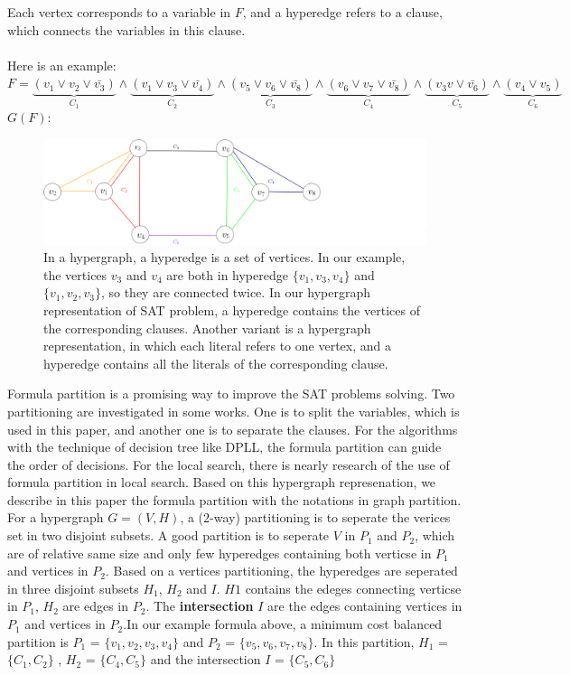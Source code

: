 \documentclass[12pt,a4paper,twoside]{scrartcl}
\numberwithin{equation}{section}
\begin{document}
  Each vertex corresponds to a variable in $F$, and a hyperedge refers to a clause, which connects the variables in this clause. \\
\\
Here is an example:\\
$F =\underbrace{(v_1 \lor v_2 \lor \bar{v_3})}_\text{$C_1$} \land \underbrace{(v_1 \lor v_3\lor \bar{v_4})}_\text{$C_2$}\land \underbrace{(v_5 \lor v_6\lor \bar{v_8})}_\text{$C_3$}\land \underbrace{(v_6 \lor v_7\lor \bar{v_8})}_\text{$C_4$}\land \underbrace{(v_3v\lor \bar{v_6})}_\text{$C_5$}\land \underbrace{(v_4 \lor v_5)}_\text{$C_6$}$\\
$G(F)$:
\begin{figure}[H]
\begin{center}
  \includegraphics[scale = 0.4]{1/hypergraph.png}
  \end{center}
  \caption{In a hypergraph, a hyperedge is a set of vertices. In our example, the vertices  $v_3$  and $v_4$ are both in hyperedge $\{v_1, v_3, v_4\}$ and $\{v_1, v_2, v_3\}$, so they are connected twice. In our hypergraph representation of SAT problem, a hyperedge contains the vertices of the corresponding clauses. Another variant is a hypergraph representation, in which each literal refers to one vertex, and a hyperedge contains all the literals of the corresponding clause.}
  \label{hypergraph representation}
  \end{figure}

Formula partition is a promising way to improve the SAT problems solving. Two partitioning are investigated in some works. One is to split the variables, which is used in this paper, and another one is to separate the clauses. For the algorithms with the technique of decision tree like DPLL, the formula partition can guide the order of decisions. For the local search, there is nearly research of the use of formula partition in local search. Based on this hypergraph represenation, we describe in this paper the formula partition with the notations in graph partition. For a hypergraph $G = (V,H)$,  a ($2$-way) partitioning is to seperate the verices set in two disjoint subsets. A good partition is to seperate $V$ in $P_1$ and $P_2$, which are of relative same size and only few hyperedges containing both verticse in $P_1$ and vertices in $P_2$.  Based on a vertices partitioning, the hyperedges are seperated in three disjoint subsets $H_1$, $H_2$ and $I$. $H1$ contains the edeges connecting verticse in $P_1$, $H_2$ are edges in $P_2$. The \textbf{intersection} $I$ are the edges containing vertices in $P_1$ and vertices in $P_2$.In our example formula above, a minimum cost balanced partition is $P_1$ = $\{v_1,v_2, v_3, v_4\}$ and $P_2$ = $\{v_5,v_6, v_7, v_8\}$. In this partition, $H_1$ = $\{C_1,C_2\}$ , $H_2$ = $\{C_4,C_5\}$ and the intersection $I$ = $\{C_5,C_6\}$ 
\clearpage
\end{document}
